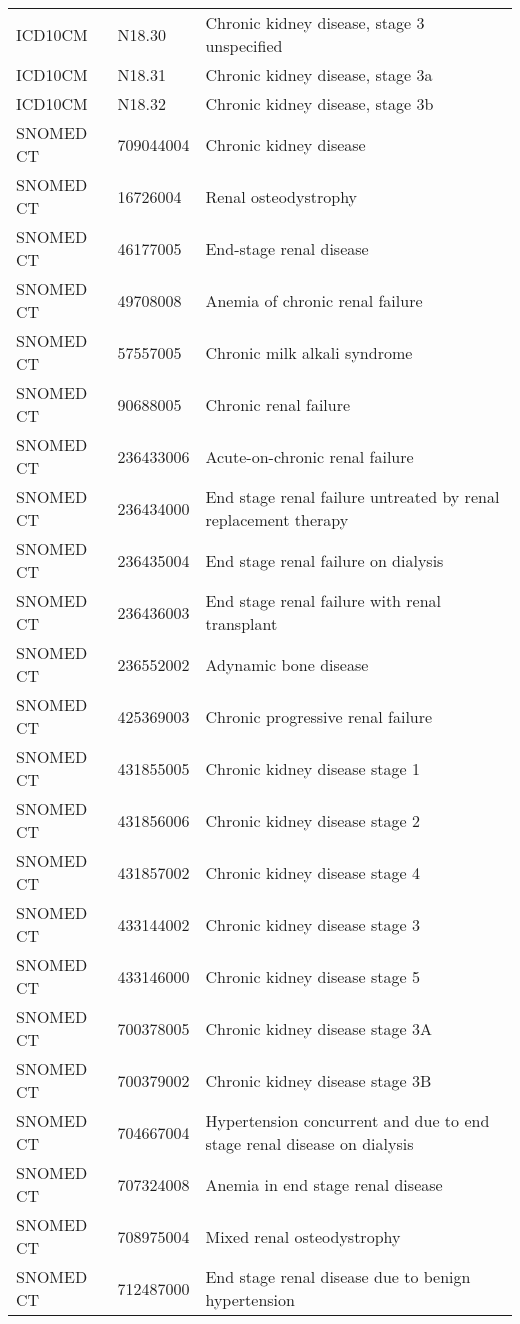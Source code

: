 \begin{table}[ht]
\begin{tabular}{lll}
  ICD10CM & N18.30 & Chronic kidney disease, stage 3 unspecified \\ 
  ICD10CM & N18.31 & Chronic kidney disease, stage 3a \\ 
  ICD10CM & N18.32 & Chronic kidney disease, stage 3b \\ 
  SNOMED CT & 709044004 & Chronic kidney disease \\ 
  SNOMED CT & 16726004 & Renal osteodystrophy \\ 
  SNOMED CT & 46177005 & End-stage renal disease \\ 
  SNOMED CT & 49708008 & Anemia of chronic renal failure \\ 
  SNOMED CT & 57557005 & Chronic milk alkali syndrome \\ 
  SNOMED CT & 90688005 & Chronic renal failure \\ 
  SNOMED CT & 236433006 & Acute-on-chronic renal failure \\ 
  SNOMED CT & 236434000 & End stage renal failure untreated by renal replacement therapy \\ 
  SNOMED CT & 236435004 & End stage renal failure on dialysis \\ 
  SNOMED CT & 236436003 & End stage renal failure with renal transplant \\ 
  SNOMED CT & 236552002 & Adynamic bone disease \\ 
  SNOMED CT & 425369003 & Chronic progressive renal failure \\ 
  SNOMED CT & 431855005 & Chronic kidney disease stage 1 \\ 
  SNOMED CT & 431856006 & Chronic kidney disease stage 2 \\ 
  SNOMED CT & 431857002 & Chronic kidney disease stage 4 \\ 
  SNOMED CT & 433144002 & Chronic kidney disease stage 3 \\ 
  SNOMED CT & 433146000 & Chronic kidney disease stage 5 \\ 
  SNOMED CT & 700378005 & Chronic kidney disease stage 3A \\ 
  SNOMED CT & 700379002 & Chronic kidney disease stage 3B \\ 
  SNOMED CT & 704667004 & Hypertension concurrent and due to end stage renal disease on dialysis \\ 
  SNOMED CT & 707324008 & Anemia in end stage renal disease \\ 
  SNOMED CT & 708975004 & Mixed renal osteodystrophy \\ 
  SNOMED CT & 712487000 & End stage renal disease due to benign hypertension \\ 

\end{tabular}
\end{table}
